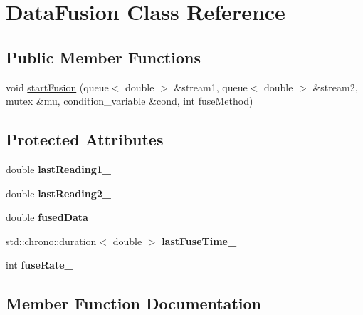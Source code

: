 \hypertarget{classDataFusion}{}\section{Data\+Fusion Class Reference}
\label{classDataFusion}
\subsection*{Public Member Functions}
\begin{DoxyCompactItemize}
\item 
void \hyperlink{classDataFusion_aa4afcc1feff6fdf9688d95ad640154cd}{start\+Fusion} (queue$<$ double $>$ \&stream1, queue$<$ double $>$ \&stream2, mutex \&mu, condition\+\_\+variable \&cond, int fuse\+Method)
\end{DoxyCompactItemize}
\subsection*{Protected Attributes}
\begin{DoxyCompactItemize}
\item 
double {\bfseries last\+Reading1\+\_\+}\hypertarget{classDataFusion_adf9b71d9520833a171900b7979210be1}{}\label{classDataFusion_adf9b71d9520833a171900b7979210be1}

\item 
double {\bfseries last\+Reading2\+\_\+}\hypertarget{classDataFusion_a3f4a0f8cdaaa4aa04bacb77aca0373d6}{}\label{classDataFusion_a3f4a0f8cdaaa4aa04bacb77aca0373d6}

\item 
double {\bfseries fused\+Data\+\_\+}\hypertarget{classDataFusion_a5dcf6bb23b44f3a5a953a4fdc5ec7579}{}\label{classDataFusion_a5dcf6bb23b44f3a5a953a4fdc5ec7579}

\item 
std\+::chrono\+::duration$<$ double $>$ {\bfseries last\+Fuse\+Time\+\_\+}\hypertarget{classDataFusion_a851740c7f918b3ec4195be061f8f275d}{}\label{classDataFusion_a851740c7f918b3ec4195be061f8f275d}

\item 
int {\bfseries fuse\+Rate\+\_\+}\hypertarget{classDataFusion_a4c036eccb8ed9b1a86ede0682e543704}{}\label{classDataFusion_a4c036eccb8ed9b1a86ede0682e543704}

\end{DoxyCompactItemize}


\subsection{Member Function Documentation}
